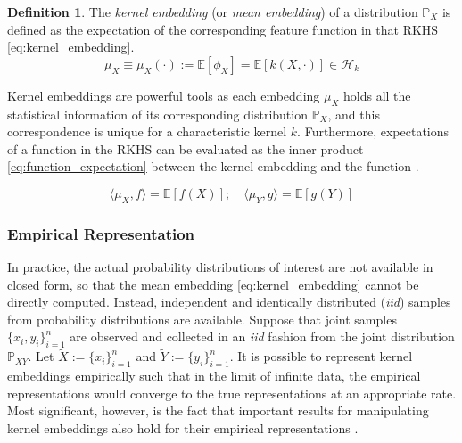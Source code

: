 \documentclass[twoside]{article} \usepackage{aistats2017}
\theoremstyle{definition}
\newtheorem{definition}{Definition}[section]
\theoremstyle{theorem}
\newcommand{\rv}[1]{{#1}}
\newcommand{\ds}[1]{\tilde{#1}}
\newcommand{\expect}[1]{{\mathbb{E}[#1]}}
\newcommand{\inner}[2]{{\langle #1, #2 \rangle}}
\newcommand{\Hk}{\mathcal{H}_{k}}
\newcommand{\muX}{\mu_{\rv{X}}}
\newcommand{\muY}{\mu_{\rv{Y}}}
\newcommand{\phiX}{\phi_{\rv{X}}}
\begin{document}
		\begin{definition} \label{def:kernel_embedding}
			\citep{smola2007hilbert}
			The \textit{kernel embedding} (or \textit{mean embedding}) of a distribution $\mathbb{P}_{\rv{X}}$ is defined as the expectation of the corresponding feature function in that RKHS \eqref{eq:kernel_embedding}.
			\begin{equation}
				\muX \equiv \muX(\cdot) := \expect{\phiX} = \expect{k(\rv{X}, \cdot)} \in \Hk
			\label{eq:kernel_embedding}
			\end{equation}
		\end{definition}
		
		Kernel embeddings are powerful tools as each embedding $\muX$ holds all the statistical information of its corresponding distribution $\mathbb{P}_{\rv{X}}$, and this correspondence is unique for a characteristic kernel $k$. Furthermore, expectations of a function in the RKHS can be evaluated as the inner product \eqref{eq:function_expectation} between the kernel embedding and the function \citep{muandet2016kernel}.
		
		\begin{equation}
			\inner{\muX}{f} = \expect{f(\rv{X})} ;\quad \inner{\muY}{g} = \expect{g(\rv{Y})}
		\label{eq:function_expectation}
		\end{equation}

		
		\subsubsection{Empirical Representation}
		\label{sec:background:kernel_embeddings:empirical_representation}
			
			In practice, the actual probability distributions of interest are not available in closed form, so that the mean embedding \eqref{eq:kernel_embedding} cannot be directly computed. Instead, independent and identically distributed (\textit{iid}) samples from probability distributions are available. Suppose that joint samples $\{x_{i}, y_{i}\}_{i = 1}^{n}$ are observed and collected in an \textit{iid} fashion from the joint distribution $\mathbb{P}_{\rv{X} \rv{Y}}$. Let $\ds{X} := \{x_{i}\}_{i = 1}^{n}$ and $\ds{Y} := \{y_{i}\}_{i = 1}^{n}$. It is possible to represent kernel embeddings empirically such that in the limit of infinite data, the empirical representations would converge to the true representations at an appropriate rate. Most significant, however, is the fact that important results for manipulating kernel embeddings also hold for their empirical representations \citep{muandet2016kernel}.
			
\end{document}
